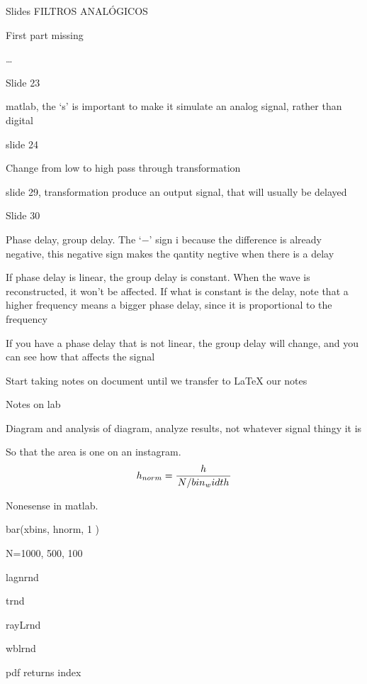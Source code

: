\documentclass[../main/main.tex]{subfiles}
\begin{document}
Slides FILTROS ANALÓGICOS

First part missing


\ldots\pagebreak\pagebreak



Slide 23

matlab, the `s' is important to make it simulate an analog signal, rather than digital

slide 24

Change from low to high pass through transformation

slide 29, transformation produce an output signal, that will usually be delayed

Slide 30

Phase delay, group delay. The `$-$' sign i because the difference is already negative, this negative sign makes the qantity negtive when there is a delay


If phase delay is linear, the group delay is constant. When the wave is reconstructed, it won't be affected.
If what is constant is the delay, note that a higher frequency means a bigger phase delay, since it is proportional to the frequency

If you have a phase delay that is not linear, the group delay will change, and you can see how that affects the signal

Start taking notes on document until we transfer to LaTeX our notes


Notes on lab

Diagram and analysis of diagram, analyze results, not whatever signal thingy it is

So that the area is one on an instagram.
\begin{equation}
	h_{norm} = \frac{h}{\flatfrac{N}{bin_width}}
\end{equation}


Nonesense in matlab.

bar(xbins, hnorm, 1 )


N=1000, 500, 100

lagnrnd

trnd

rayLrnd

wblrnd

pdf returns index
\end{document}
